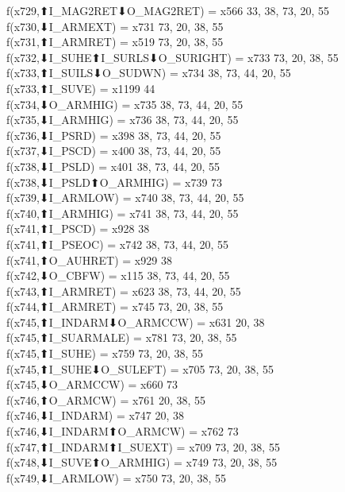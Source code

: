 f(x729,⬆I_MAG2RET⬇O_MAG2RET) = x566 {33, 38, 73, 20, 55} \\
f(x730,⬇I_ARMEXT) = x731 {73, 20, 38, 55} \\
f(x731,⬆I_ARMRET) = x519 {73, 20, 38, 55} \\
f(x732,⬇I_SUHE⬆I_SURLS⬇O_SURIGHT) = x733 {73, 20, 38, 55} \\
f(x733,⬆I_SUILS⬇O_SUDWN) = x734 {38, 73, 44, 20, 55} \\
f(x733,⬆I_SUVE) = x1199 {44} \\
f(x734,⬇O_ARMHIG) = x735 {38, 73, 44, 20, 55} \\
f(x735,⬇I_ARMHIG) = x736 {38, 73, 44, 20, 55} \\
f(x736,⬇I_PSRD) = x398 {38, 73, 44, 20, 55} \\
f(x737,⬇I_PSCD) = x400 {38, 73, 44, 20, 55} \\
f(x738,⬇I_PSLD) = x401 {38, 73, 44, 20, 55} \\
f(x738,⬇I_PSLD⬆O_ARMHIG) = x739 {73} \\
f(x739,⬇I_ARMLOW) = x740 {38, 73, 44, 20, 55} \\
f(x740,⬆I_ARMHIG) = x741 {38, 73, 44, 20, 55} \\
f(x741,⬆I_PSCD) = x928 {38} \\
f(x741,⬆I_PSEOC) = x742 {38, 73, 44, 20, 55} \\
f(x741,⬆O_AUHRET) = x929 {38} \\
f(x742,⬇O_CBFW) = x115 {38, 73, 44, 20, 55} \\
f(x743,⬆I_ARMRET) = x623 {38, 73, 44, 20, 55} \\
f(x744,⬆I_ARMRET) = x745 {73, 20, 38, 55} \\
f(x745,⬆I_INDARM⬇O_ARMCCW) = x631 {20, 38} \\
f(x745,⬆I_SUARMALE) = x781 {73, 20, 38, 55} \\
f(x745,⬆I_SUHE) = x759 {73, 20, 38, 55} \\
f(x745,⬆I_SUHE⬇O_SULEFT) = x705 {73, 20, 38, 55} \\
f(x745,⬇O_ARMCCW) = x660 {73} \\
f(x746,⬆O_ARMCW) = x761 {20, 38, 55} \\
f(x746,⬇I_INDARM) = x747 {20, 38} \\
f(x746,⬇I_INDARM⬆O_ARMCW) = x762 {73} \\
f(x747,⬆I_INDARM⬆I_SUEXT) = x709 {73, 20, 38, 55} \\
f(x748,⬇I_SUVE⬆O_ARMHIG) = x749 {73, 20, 38, 55} \\
f(x749,⬇I_ARMLOW) = x750 {73, 20, 38, 55} \\
